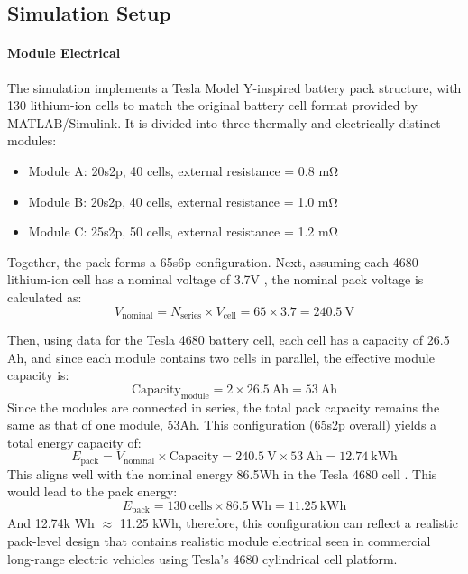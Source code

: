 \documentclass[conference]{IEEEtran}
\begin{document}
\subsection{\textbf{Simulation Setup}}
\paragraph{\textbf{Module Electrical}}
The simulation implements a Tesla Model Y-inspired battery pack structure, with 130 lithium-ion cells to match the original battery cell format provided by MATLAB/Simulink. It is divided into three thermally and electrically distinct modules:

\begin{itemize}
    \item Module A: 20s2p, 40 cells, external resistance = 0.8 m\si{\ohm}
    \item Module B: 20s2p, 40 cells, external resistance = 1.0 m\si{\ohm}
    \item Module C: 25s2p, 50 cells, external resistance = 1.2 m\si{\ohm}
\end{itemize}

Together, the pack forms a 65s6p configuration. Next, assuming each 4680 lithium-ion cell has a nominal voltage of 3.7V \cite{nigel2022tesla}, the nominal pack voltage is calculated as:
\[
V_{\text{nominal}} = N_{\text{series}} \times V_{\text{cell}} = 65 \times 3.7 = \boxed{240.5~\text{V}}
\] 

Then, using \cite{nigel2022specific} data for the Tesla 4680 battery cell, each cell has a capacity of 26.5 Ah, and since each module contains two cells in parallel, the effective module capacity is:
\[
\text{Capacity}_{\text{module}} = 2 \times 26.5~\text{Ah} = \boxed{53~\text{Ah}}
\]
Since the modules are connected in series, the total pack capacity remains the same as that of one module, 53Ah. This configuration (65s2p overall) yields a total energy capacity of:
\[
E_{\text{pack}} = V_{\text{nominal}} \times \text{Capacity} = 240.5~\text{V} \times 53~\text{Ah} = \boxed{12.74~\text{kWh}}
\]
This aligns well with the nominal energy 86.5Wh in the Tesla 4680 cell \cite{nigel2022tesla}. This would lead to the pack energy:
\[
E_{\text{pack}} = 130~\text{cells} \times 86.5~\text{Wh} = \boxed{11.25~\text{kWh}}
\]
And 12.74k Wh $\approx$ 11.25 kWh, therefore, this configuration can reflect a realistic pack-level design that contains realistic module electrical seen in commercial long-range electric vehicles using Tesla's 4680 cylindrical cell platform. 
\end{document}
